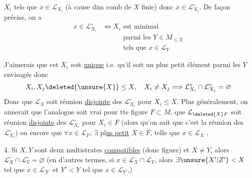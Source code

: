 $X_i$ tels que $x\in\mathcal{L}_{X_i}$ (à cause dim comb de $X$ finie) donc $x\in \mathcal{L}_{X_i}^{\circ}$. De façon précise, on a
\[
\begin{aligned}
 x\in \mathcal{L}_{X_i}^{\circ}&\Longleftrightarrow X_i\text{ est minimal}\\
 &\hspace{3em}\text{parmi les }Y\in M_{\leq X}\\
 &\hspace{3em}\text{tels que }x\in \mathcal{L}_Y
\end{aligned}
\]

J'aimerais que cet $X_i$ soit \uline{unique} i.e. qu'il soit un plus petit élément parmi les $Y$ envisagés donc
\[
 X_i,X_j\deleted{\unsure{X}}\leq X,\quad X_i\ne X_j\Longrightarrow \mathcal{L}_{X_i}^{\circ}\cap \mathcal{L}_{X_j}^{\circ}=\varnothing
\]
Donc que $\mathcal{L}_X$ soit réunion \uline{disjointe} des $\mathcal{L}_{X_i}^{\circ}$ pour $X_i\leq X$. Plus généralement, on aimerait que l'analogue soit vrai pour tte figure $F\subset M$,  que $\mathcal{L}_{\deleted{X}F}$ soit réunion \uline{disjointe} des  $\mathcal{L}_{X_i}^{\circ}$ pour $X_i\in F$ (alors qu'on sait  que c'est la réunion des $\mathcal{L}_{X_i}^{\circ}$) ou encore que $\forall x\in \mathcal{L}_F$, $\exists$ pl\uline{us petit} $X\in F$, telle que $x\in \mathcal{L}_X$ ,

\uline{} 4. Si $X,Y$ sont deux multistrates \uline{compatibles} (donc   figure) et $X\ne Y$, alors $\mathcal{L}_X^{\circ}\cap \mathcal{L}_Y^{\circ}=\varnothing$ (en d'autres termes, si $x\in \mathcal{L}_X\cap \mathcal{L}_Y$, alors  $\exists\unsure{X'|Z'}<X$ tel que $x\in \mathcal{L}_{X'}$ et  $Y'<Y$ tel que $x\in \mathcal{L}_{Y'}$,) 

